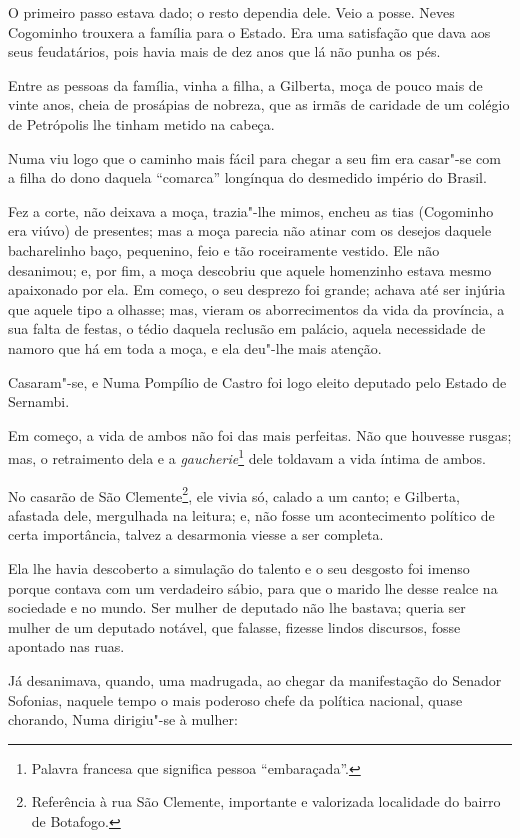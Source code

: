 O primeiro passo estava dado; o resto dependia dele. Veio a posse. Neves
Cogominho trouxera a família para o Estado. Era uma satisfação que dava
aos seus feudatários, pois havia mais de dez anos que lá não punha os
pés.

Entre as pessoas da família, vinha a filha, a Gilberta, moça de pouco
mais de vinte anos, cheia de prosápias de nobreza, que as irmãs de
caridade de um colégio de Petrópolis lhe tinham metido na cabeça.

Numa viu logo que o caminho mais fácil para chegar a seu fim era
casar"-se com a filha do dono daquela ``comarca'' longínqua do desmedido
império do Brasil.

Fez a corte, não deixava a moça, trazia"-lhe mimos, encheu as tias
(Cogominho era viúvo) de presentes; mas a moça parecia não atinar com os
desejos daquele bacharelinho baço, pequenino, feio e tão roceiramente
vestido. Ele não desanimou; e, por fim, a moça descobriu que aquele
homenzinho estava mesmo apaixonado por ela. Em começo, o seu desprezo
foi grande; achava até ser injúria que aquele tipo a olhasse; mas,
vieram os aborrecimentos da vida da província, a sua falta de festas, o
tédio daquela reclusão em palácio, aquela necessidade de namoro que há
em toda a moça, e ela deu"-lhe mais atenção.

Casaram"-se, e Numa Pompílio de Castro foi logo eleito deputado pelo
Estado de Sernambi.

Em começo, a vida de ambos não foi das mais perfeitas. Não que houvesse
rusgas; mas, o retraimento dela e a \emph{gaucherie}\footnote{Palavra
  francesa que significa pessoa ``embaraçada''.} dele toldavam a vida
íntima de ambos.

No casarão de São Clemente\footnote{Referência à rua São Clemente,
  importante e valorizada localidade do bairro de Botafogo.}, ele vivia
só, calado a um canto; e Gilberta, afastada dele, mergulhada na leitura;
e, não fosse um acontecimento político de certa importância, talvez a
desarmonia viesse a ser completa.

Ela lhe havia descoberto a simulação do talento e o seu desgosto foi
imenso porque contava com um verdadeiro sábio, para que o marido lhe
desse realce na sociedade e no mundo. Ser mulher de deputado não lhe
bastava; queria ser mulher de um deputado notável, que falasse, fizesse
lindos discursos, fosse apontado nas ruas.

Já desanimava, quando, uma madrugada, ao chegar da manifestação do
Senador Sofonias, naquele tempo o mais poderoso chefe da política
nacional, quase chorando, Numa dirigiu"-se à mulher:

